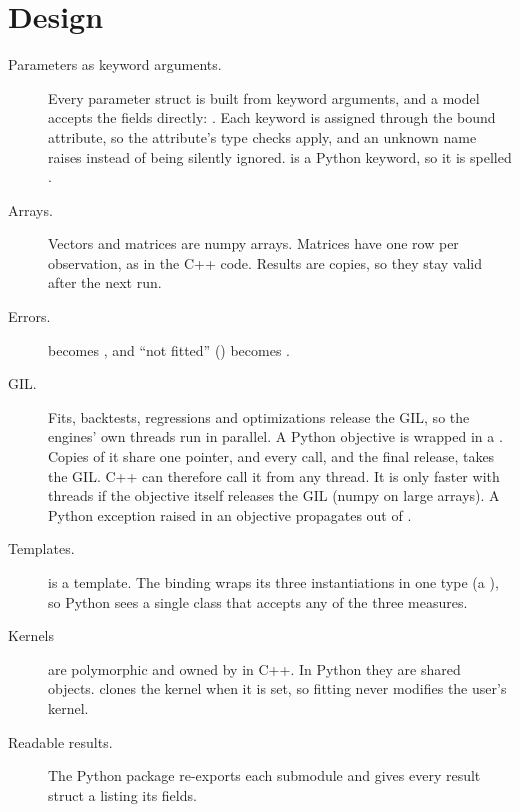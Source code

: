 \section{Design}
\begin{description}
  \item[Parameters as keyword arguments.] Every parameter struct is built from keyword
        arguments, and a model accepts the fields directly:
        . Each keyword is assigned through the bound
        attribute, so the attribute's type checks apply, and an unknown name raises
         instead of being silently ignored.  is a Python
        keyword, so it is spelled .
  \item[Arrays.] Vectors and matrices are  numpy arrays. Matrices have one row
        per observation, as in the C++ code. Results are copies, so they stay valid after
        the next run.
  \item[Errors.]  becomes , and ``not fitted''
        () becomes .
  \item[GIL.] Fits, backtests, regressions and optimizations release the GIL, so the
        engines' own threads run in parallel. A Python objective is wrapped in a
        . Copies of it share one pointer, and every call, and the final
        release, takes the GIL. C++ can therefore call it from any thread. It is only
        faster with threads if the objective itself releases the GIL (numpy on large
        arrays). A Python exception raised in an objective propagates out of
        .
  \item[Templates.]  is a template. The binding wraps its
        three instantiations in one  type (a ),
        so Python sees a single  class that accepts any of the three
        measures.
  \item[Kernels] are polymorphic and owned by  in C++. In Python they
        are shared objects.  clones the kernel when it is set,
        so fitting never modifies the user's kernel.
  \item[Readable results.] The Python package re-exports each submodule and gives every
        result struct a  listing its fields.
\end{description}

